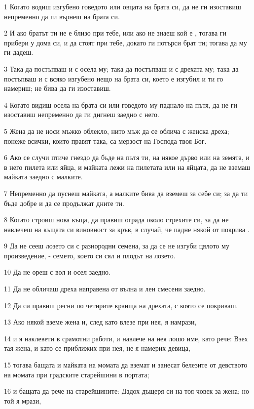 \par 1 Когато водиш изгубено говедото или овцата на брата си, да не ги изоставиш непременно да ги върнеш на брата си.
\par 2 И ако братът ти не е близо при тебе, или ако не знаеш кой е , тогава ги прибери у дома си, и да стоят при тебе, докато ги потърси брат ти; тогава да му ги дадеш.
\par 3 Така да постъпваш и с осела му; така да постъпваш и с дрехата му; така да постъпваш и с всяко изгубено нещо на брата си, което е изгубил и ти го намериш; не бива да ги изоставиш.
\par 4 Когато видиш осела на брата си или говедото му паднало на пътя, да не ги изоставиш непременно да ги дигнеш заедно с него.
\par 5 Жена да не носи мъжко облекло, нито мъж да се облича с женска дреха; понеже всички, които правят така, са мерзост на Господа твоя Бог.
\par 6 Ако се случи птиче гнездо да бъде на пътя ти, на някое дърво или на земята, и в него пилета или яйца, и майката лежи на пилетата или на яйцата, да не вземаш майката заедно с малките.
\par 7 Непременно да пуснеш майката, а малките бива да вземеш за себе си; за да ти бъде добре и да се продължат дните ти.
\par 8 Когато строиш нова къща, да правиш ограда около стрехите си, за да не навлечеш на къщата си виновност за кръв, в случай, че падне някой от покрива .
\par 9 Да не сееш лозето си с разнородни семена, за да се не изгуби цялото му произведение, - семето, което си сял и плодът на лозето.
\par 10 Да не ореш с вол и осел заедно.
\par 11 Да не обличаш дреха направена от вълна и лен смесени заедно.
\par 12 Да си правиш ресни по четирите краища на дрехата, с която се покриваш.
\par 13 Ако някой вземе жена и, след като влезе при нея, я намрази,
\par 14 и я наклевети в срамотни работи, и навлече на нея лошо име, като рече: Взех тая жена, и като се приближих при нея, не я намерих девица,
\par 15 тогава бащата и майката на момата да вземат и занесат белезите от девството на момата при градските старейшини в портата;
\par 16 и бащата да рече на старейшините: Дадох дъщеря си на тоя човек за жена; но той я мрази,

